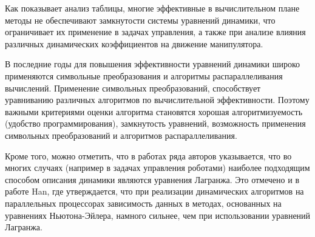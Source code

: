 Как показывает анализ таблицы, многие эффективные в вычислительном плане методы не обеспечивают замкнутости системы уравнений динамики, что ограничивает их применение в задачах управления, а также при анализе влияния различных динамических коэффициентов на движение манипулятора.

В последние годы для повышения эффективности уравнений динамики широко применяются символьные преобразования и алгоритмы распараллеливания вычислений. Применение символьных преобразований, способствует уравниванию различных алгоритмов по вычислительной эффективности. Поэтому важными критериями оценки алгоритма становятся  хорошая  алгоритмизуемость (удобство программирования), замкнутость уравнений, возможность применения символьных преобразований и алгоритмов распараллеливания.

Кроме того, можно отметить, что в работах ряда авторов указывается, что во многих случаях (например в задачах управления роботами) наиболее подходящим способом описания динамики являются уравнения Лагранжа. Это отмечено и в работе Han, где утверждается, что при реализации динамических алгоритмов на параллельных процессорах зависимость данных в методах, основанных на уравнениях Ньютона-Эйлера, намного сильнее, чем при использовании уравнений Лагранжа.

